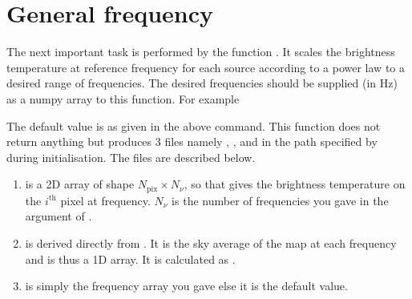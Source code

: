 \documentclass[letterpaper,10pt,english]{sphinxmanual}
\begin{document}
\section{General frequency}
\label{\detokenize{detexp:general-frequency}}
\sphinxAtStartPar
The next important task is performed by the function . It
scales the brightness temperature at reference frequency for each source
according to a power law to a desired range of frequencies. The desired
frequencies should be supplied (in Hz) as a numpy array to this
function. For example

\begin{sphinxVerbatim}[commandchars=\\\{\}]
  
\end{sphinxVerbatim}

\sphinxAtStartPar
The default value is as given in the above command. This function does
not return anything but produces 3 files namely ,
, and  in the path specified by
 during initialisation. The files are described below.
\begin{enumerate}
%
\item {} 
\sphinxAtStartPar
{} is a 2D array of shape \(N_{\mathrm{pix}}\times
N_{\nu}\), so that  gives the brightness temperature
on the \(i^{\mathrm{th}}\) pixel at  frequency. \(N_{\nu}\) is
the number of frequencies you gave in the argument of .

\item {} 
\sphinxAtStartPar
{} is derived directly from . It is the sky
average of the map at each frequency and is thus a 1D array. It is
calculated as .

\item {} 
\sphinxAtStartPar
{} is simply the frequency array you gave else it is the
default value.

\end{enumerate}
\end{document}
